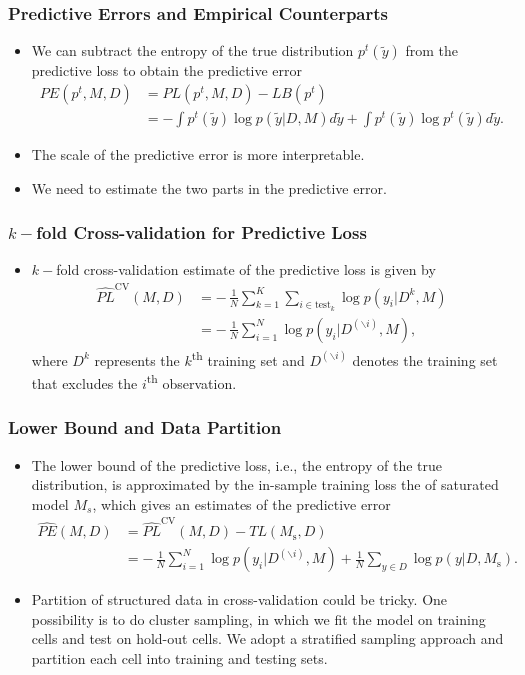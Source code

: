 \documentclass[xetex,mathserif,serif]{beamer}
\begin{document}
\begin{frame}
  \frametitle{Predictive Errors and Empirical Counterparts}
  \begin{itemize}
  \item We can subtract the entropy of the true distribution $p^t(\tilde y)$
    from the predictive loss to obtain the predictive error
    \begin{align*}
      PE(p^t, M, D)&= PL(p^t, M, D) - LB(p^t) \\  
      &=-\int p^t(\tilde y) \log p(\tilde y|D, M) d\tilde y+\int p^t(\tilde y) \log p^t(\tilde y) d\tilde y.
    \end{align*}
  \item The scale of the predictive error is more interpretable.
  \item We need to estimate the two parts in the predictive error.
  \end{itemize}
\end{frame}

\begin{frame}
  \frametitle{$k-$fold Cross-validation for Predictive Loss}
  \begin{itemize}
  \item $k-$fold cross-validation estimate of the predictive loss is given by
    \begin{align*}
      \widehat{PL}^{\text{CV}}(M, D) &=-\,\frac{1}{N}\sum_{k=1}^K\sum_{i\in
        \text{test}_k}\log p(y_i|D^k, M)\\
      &=-\,\frac{1}{N}\sum_{i=1}^N\log p(y_i|D^{(\backslash i)}, M),
\end{align*}
where $D^k$ represents the $k$\textsuperscript{th} training set and
$D^{(\backslash i)}$ denotes the training set that excludes the
$i$\textsuperscript{th} observation.
  \end{itemize}
\end{frame}

\begin{frame}
  \frametitle{Lower Bound and Data Partition}
  \begin{itemize}
  \item The lower bound of the predictive loss, i.e., the entropy of the true
    distribution, is approximated by the in-sample training loss the of saturated
    model $M_s$, which gives an estimates of the predictive error
    \begin{align*}
      \widehat{PE}(M, D)&=\widehat{PL}^{\text{CV}}(M,D)-TL(M_{\text{s}},D)\\  \label{eq:esti_preerror}
      &= -\,\frac{1}{N}\sum_{i=1}^N\log p(y_i|D^{(\backslash i)},
      M)+\frac{1}{N}\sum_{y\in D}\log p(y | D, M_{\text{s}}).
    \end{align*}
  \item Partition of structured data in cross-validation could be tricky. One
    possibility is to do cluster sampling, in which we fit the model on training
    cells and test on hold-out cells. We adopt a stratified sampling approach and
    partition each cell into training and testing sets.
  \end{itemize}
\end{frame}
\end{document}
